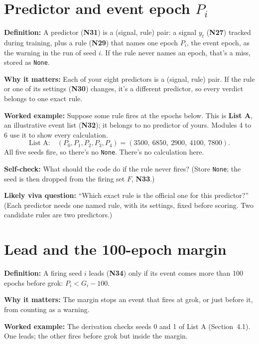 \documentclass[11pt,a4paper,oneside,openany]{report}
\newcommand{\None}{\texttt{None}}
\newcommand{\gl}[1]{\textbf{#1}}   %
\newcommand{\fdef}{\textbf{Definition:} }
\newcommand{\fwhy}{\par\textbf{Why it matters:} }
\newcommand{\fex}{\par\textbf{Worked example:} }
\newcommand{\fself}{\par\textbf{Self-check:} }
\newcommand{\fviva}{\par\textbf{Likely viva question:} }
\begin{document}
\section{Predictor and event epoch $P_i$}
\fdef A predictor (\gl{N31}) is a (signal, rule) pair: a signal $y_t$ (\gl{N27}) tracked during training, plus a rule (\gl{N29}) that names one epoch $P_i$, the event epoch, as the warning in the run of seed $i$. If the rule never names an epoch, that's a miss, stored as \None.
\fwhy Each of your eight predictors is a (signal, rule) pair. If the rule or one of its settings (\gl{N30}) changes, it's a different predictor, so every verdict belongs to one exact rule.
\fex Suppose some rule fires at the epochs below. This is \textbf{List A}, an illustrative event list (\gl{N32}); it belongs to no predictor of yours. Modules 4 to 6 use it to show every calculation.
\[
\text{List A:}\quad (P_0, P_1, P_2, P_3, P_4) = (3500,\ 6850,\ 2900,\ 4100,\ 7800).
\]
All five seeds fire, so there's no \None. There's no calculation here.
\fself What should the code do if the rule never fires? (Store \None; the seed is then dropped from the firing set $F$, \gl{N33}.)
\fviva ``Which exact rule is the official one for this predictor?'' (Each predictor needs one named rule, with its settings, fixed before scoring. Two candidate rules are two predictors.)

\section{Lead and the 100-epoch margin}
\fdef A firing seed $i$ leads (\gl{N34}) only if its event comes more than 100 epochs before grok: $P_i < G_i - 100$.
\fwhy The margin stops an event that fires at grok, or just before it, from counting as a warning.
\fex The derivation checks seeds 0 and 1 of List A (Section~4.1). One leads; the other fires before grok but inside the margin.
\end{document}
